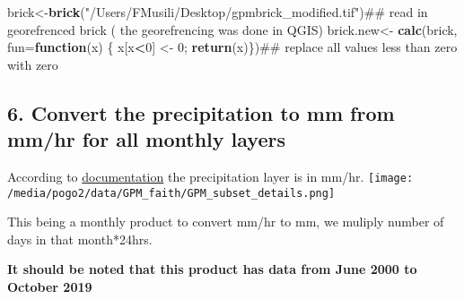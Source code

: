 \documentclass[]{article}
\newenvironment{Shaded}{\begin{snugshade}}{\end{snugshade}}
\newcommand{\KeywordTok}[1]{\textcolor[rgb]{0.13,0.29,0.53}{\textbf{#1}}}
\newcommand{\DataTypeTok}[1]{\textcolor[rgb]{0.13,0.29,0.53}{#1}}
\newcommand{\DecValTok}[1]{\textcolor[rgb]{0.00,0.00,0.81}{#1}}
\newcommand{\StringTok}[1]{\textcolor[rgb]{0.31,0.60,0.02}{#1}}
\newcommand{\ControlFlowTok}[1]{\textcolor[rgb]{0.13,0.29,0.53}{\textbf{#1}}}
\newcommand{\OperatorTok}[1]{\textcolor[rgb]{0.81,0.36,0.00}{\textbf{#1}}}
\newcommand{\NormalTok}[1]{#1}
\begin{document}
\begin{Shaded}
\begin{Highlighting}[]
\NormalTok{brick<-}\KeywordTok{brick}\NormalTok{(}\StringTok{"/Users/FMusili/Desktop/gpmbrick_modified.tif"}\NormalTok{)## read in georefrenced brick ( the georefrencing was done in QGIS)}
\NormalTok{brick.new<-}\StringTok{ }\KeywordTok{calc}\NormalTok{(brick, }\DataTypeTok{fun=}\ControlFlowTok{function}\NormalTok{(x) \{ x[x}\OperatorTok{<}\DecValTok{0}\NormalTok{] <-}\StringTok{ }\DecValTok{0}\NormalTok{; }\KeywordTok{return}\NormalTok{(x)\})## replace all values less than zero with zero }
\end{Highlighting}
\end{Shaded}

\subsection{6. Convert the precipitation to mm from mm/hr for all
monthly
layers}\label{convert-the-precipitation-to-mm-from-mmhr-for-all-monthly-layers}

According to
\href{https://pmm.nasa.gov/sites/default/files/document_files/IMERG_doc_190909.pdf}{documentation}
the precipitation layer is in mm/hr.
\texttt{[image: /media/pogo2/data/GPM\_faith/GPM\_subset\_details.png]}

This being a monthly product to convert mm/hr to mm, we muliply number
of days in that month*24hrs.

\textbf{It should be noted that this product has data from June 2000 to
October 2019}
\end{document}
